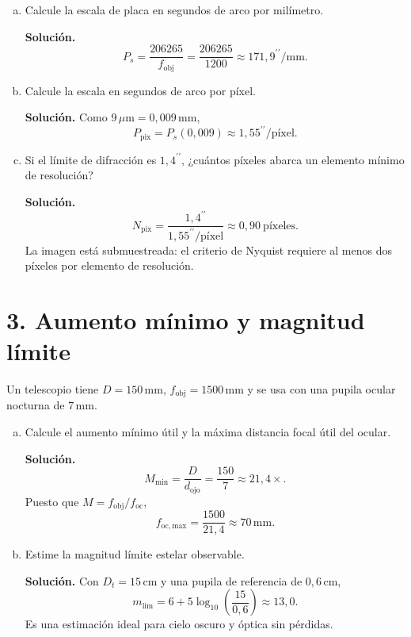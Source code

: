 \documentclass[a4paper,11pt]{article}
\newcommand{\respuesta}[1]{\par\textcolor{blue!60!black}{\textbf{Solución.}} #1}
\begin{document}
\begin{enumerate}[a)]
    \item Calcule la escala de placa en segundos de arco por milímetro.

    \respuesta{
    \[
        P_s=\frac{206265}{f_{\mathrm{obj}}}
        =\frac{206265}{1200}
        \approx171{,}9^{\prime\prime}/\mathrm{mm}.
    \]}

    \item Calcule la escala en segundos de arco por píxel.

    \respuesta{Como $9\,\mu\mathrm{m}=0{,}009\,\mathrm{mm}$,
    \[
        P_{\mathrm{pix}}=P_s(0{,}009)
        \approx1{,}55^{\prime\prime}/\text{píxel}.
    \]}

    \item Si el límite de difracción es $1{,}4^{\prime\prime}$, ¿cuántos píxeles abarca un elemento mínimo de resolución?

    \respuesta{
    \[
        N_{\mathrm{pix}}
        =\frac{1{,}4^{\prime\prime}}{1{,}55^{\prime\prime}/\text{píxel}}
        \approx0{,}90\ \text{píxeles}.
    \]
    La imagen está submuestreada: el criterio de Nyquist requiere al menos dos píxeles por elemento de resolución.}
\end{enumerate}

\section*{3. Aumento mínimo y magnitud límite}

Un telescopio tiene $D=150\,\mathrm{mm}$, $f_{\mathrm{obj}}=1500\,\mathrm{mm}$ y se usa con una pupila ocular nocturna de $7\,\mathrm{mm}$.

\begin{enumerate}[a)]
    \item Calcule el aumento mínimo útil y la máxima distancia focal útil del ocular.

    \respuesta{
    \[
        M_{\min}=\frac{D}{d_{\mathrm{ojo}}}
        =\frac{150}{7}\approx21{,}4\times.
    \]
    Puesto que $M=f_{\mathrm{obj}}/f_{\mathrm{oc}}$,
    \[
        f_{\mathrm{oc,max}}
        =\frac{1500}{21{,}4}\approx70\,\mathrm{mm}.
    \]}

    \item Estime la magnitud límite estelar observable.

    \respuesta{Con $D_t=15\,\mathrm{cm}$ y una pupila de referencia de $0{,}6\,\mathrm{cm}$,
    \[
        m_{\lim}=6+5\log_{10}\left(\frac{15}{0{,}6}\right)
        \approx13{,}0.
    \]
    Es una estimación ideal para cielo oscuro y óptica sin pérdidas.}
\end{enumerate}
\end{document}

